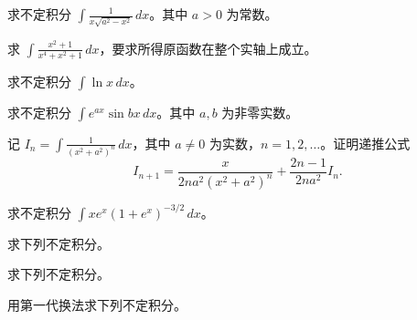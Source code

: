 \noindent\begin{minipage}{\textwidth}
求不定积分 $\displaystyle\int \frac1{x\sqrt{a^2-x^2}}\,dx$。其中 $a>0$ 为常数。
\end{minipage}\par\vfill
\noindent\begin{minipage}{\textwidth}
求 $\displaystyle\int\frac{x^2+1}{x^4+x^2+1}\,dx$，要求所得原函数在整个实轴上成立。
\end{minipage}\par\vfill
\noindent\begin{minipage}{\textwidth}
求不定积分 $\displaystyle\int \ln x\,dx$。
\end{minipage}\par\vfill
\newpage
\noindent\begin{minipage}{\textwidth}
求不定积分 $\displaystyle\int e^{ax}\sin bx\,dx$。其中 $a,b$ 为非零实数。
\end{minipage}\par\vfill
\noindent\begin{minipage}{\textwidth}
记 $I_n=\displaystyle\int\frac1{(x^2+a^2)^n}\,dx$，其中 $a\ne0$ 为实数，$n=1,2,\ldots$。证明递推公式\[I_{n+1}=\frac{x}{2na^2(x^2+a^2)^n}+\frac{2n-1}{2na^2}I_n.\]
\end{minipage}\par\vfill
\noindent\begin{minipage}{\textwidth}
求不定积分 $\displaystyle\int xe^x(1+e^x)^{-3/2}\,dx$。
\end{minipage}\par\vfill
\noindent\begin{minipage}{\textwidth}
求下列不定积分。
\end{minipage}\par\vfill
\newpage
\noindent\begin{minipage}{\textwidth}
求下列不定积分。
\end{minipage}\par\vfill
\noindent\begin{minipage}{\textwidth}
用第一代换法求下列不定积分。
\end{minipage}\par\vfill
